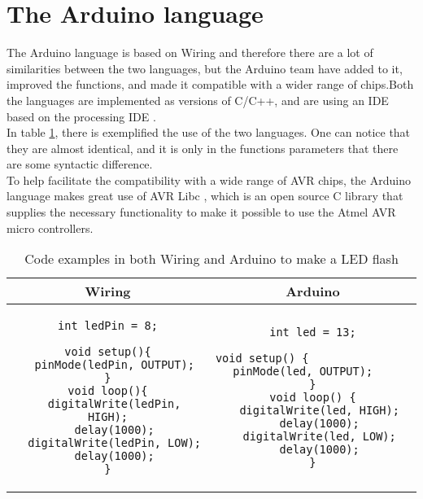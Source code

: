 \section{The Arduino language}
The Arduino language is based on Wiring and therefore there are a lot of similarities between the two languages, but the Arduino team have added to it, improved the functions, and made it compatible with a wider range of chips.Both the languages are implemented as versions of C/C++, and are using an IDE based on the processing IDE \cite{Wiring:thesis}\cite{Arduino:IDE}.\\

In table \ref{tabel:comparison}, there is exemplified the use of the two languages. One can notice that they are almost identical, and it is only in the functions parameters that there are some syntactic difference.\\ 
To help facilitate the compatibility with a wide range of AVR chips, the Arduino language makes great use of AVR Libc \cite{AVR:lib}, which is an open source C library that supplies the necessary functionality to make it possible to use the Atmel AVR micro controllers.\\

\begin{table}[H]
\centering
\begin{tabular}{cc}
Wiring 
& 
Arduino \\ 
\hline 
\begin{lstlisting}
int ledPin = 8;

void setup(){
  pinMode(ledPin, OUTPUT);
}
void loop(){
  digitalWrite(ledPin, HIGH);
  delay(1000);
  digitalWrite(ledPin, LOW);
  delay(1000);
}
\end{lstlisting}  
& 
\begin{lstlisting}
int led = 13;

void setup() {                
  pinMode(led, OUTPUT);     
}
void loop() {
  digitalWrite(led, HIGH);
  delay(1000);
  digitalWrite(led, LOW);
  delay(1000);
}
\end{lstlisting} 
\end{tabular} 
\caption{Code examples in both Wiring and Arduino to make a LED flash}
\label{tabel:comparison}
\end{table}

